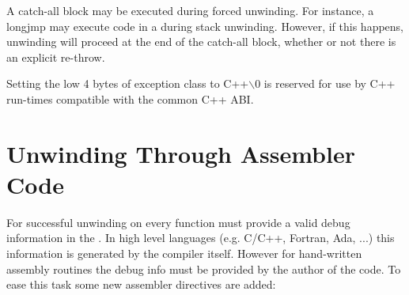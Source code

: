 A catch-all block may be executed during forced unwinding.  For
instance, a longjmp may execute code in a  during
stack unwinding. However, if this happens, unwinding will proceed at
the end of the catch-all block, whether or not there is an explicit
re-throw.

Setting the low 4 bytes of exception class to C++$\backslash$0 is reserved
for use by C++ run-times compatible with the common C++ ABI.

\section{Unwinding Through Assembler Code}

For successful unwinding on \xARCH every function must provide a valid
debug information in the . In high level languages (e.g. C/C++, Fortran, Ada, ...)
this information is generated by the compiler itself. However for
hand-written assembly routines the debug info must be provided by the
author of the code. To ease this task some new assembler directives
are added:

